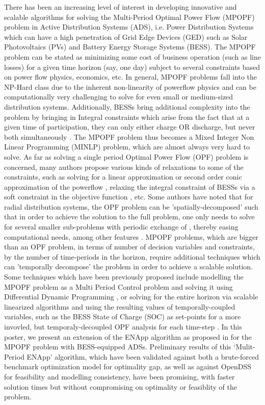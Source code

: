 \documentclass[conference]{IEEEtran} %
\begin{document}
There has been an increasing level of interest in developing innovative and scalable algorithms for solving the Multi-Period Optimal Power Flow (MPOPF) problem in Active Distribution Systems (ADS), i.e. Power Distribution Systems which can have a high penetration of Grid Edge Devices (GED) such as Solar Photovoltaics (PVs) and Battery Energy Storage Systems (BESS). The MPOPF problem can be stated as minimizing some cost of business operation (such as line losses) for a given time horizon (say, one day) subject to several constraints based on power flow physics, economics, etc. In general, MPOPF problems fall into the NP-Hard class \cite{Lehmann2015Mar} due to the inherent non-linearity of powerflow physics \cite{bfm01} and can be computationally very challenging to solve for even small or medium-sized distribution systems. Additionally, BESSs bring additional complexity into the problem by bringing in Integral constraints which arise from the fact that at a given time of participation, they can only either charge OR discharge, but never both simultaneously \cite{Nazir2021Sep}. The MPOPF problem thus becomes a Mixed Integer Non Linear Programming (MINLP) problem, which are almost always very hard to solve. As far as solving a single period Optimal Power Flow (OPF) problem is concerned, many authors propose various kinds of relaxations to some of the constraints, such as solving for a linear approximation or second order conic approximation of the powerflow \cite{Baran1989Apr, Gan, Farivar, Nazir2018Jun}, relaxing the integral constraint of BESSs via a soft constraint in the objective function \cite{Nazir2018Jun, ddp_sugar_01}, etc. Some authors have noted that for radial distribution systems, the OPF problem can be 'spatially-decomposed' such that in order to achieve the solution to the full problem, one only needs to solve for several smaller sub-problems with periodic exchange of , thereby easing computational needs, among other features \cite{Sadnan}. MPOPF problems, which are bigger than an OPF problem, in terms of number of decision variables and constraints, by the number of time-periods in the horizon, require additional techniques which can 'temporally decompose' the problem in order to achieve a scalable solution. Some techniques which have been previously proposed include modelling the MPOPF problem as a Multi Period Control problem and solving it using Differential Dynamic Programming \cite{ddp_sugar_01, Qian2014Jul}, or solving for the entire horizon via scalable linearized algorithms and using the resulting values of temporally-coupled variables, such as the BESS State of Charge (SOC) as set-points for a more invovled, but temporaly-decoupled OPF analysis for each time-step \cite{Nazir2018Jun, Nazir2019Jun}.
In this poster, we present an extension of the ENApp algorithm as proposed in \cite{Sadnan} for the MPOPF problem with BESS-equipped ADSs. Preliminary results of this `Mulit-Period ENApp' algorithm, which have been validated against both a brute-forced benchmark optimization model for optimality gap, as well as against OpenDSS \cite{OpenDSS-Website} for feasibility and modelling consistency, have been promising, with faster solution times but without compromising on optimality or feasiblity of the problem. 



\end{document}
